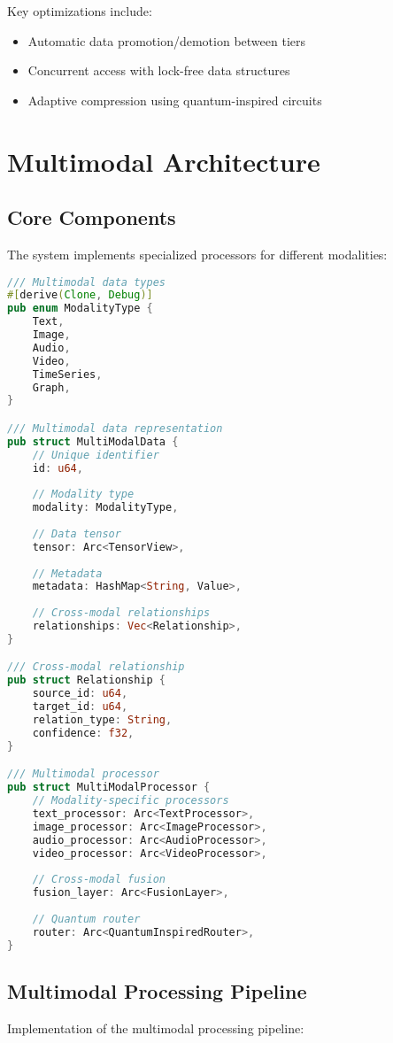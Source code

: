 \documentclass[10pt,twocolumn]{article}
\begin{document}
Key optimizations include:
\begin{itemize}
    \item Automatic data promotion/demotion between tiers
    \item Concurrent access with lock-free data structures
    \item Adaptive compression using quantum-inspired circuits
\end{itemize}

\section{Multimodal Architecture}
\subsection{Core Components}
The system implements specialized processors for different modalities:

\begin{lstlisting}[language=Rust]
/// Multimodal data types
#[derive(Clone, Debug)]
pub enum ModalityType {
    Text,
    Image,
    Audio,
    Video,
    TimeSeries,
    Graph,
}

/// Multimodal data representation
pub struct MultiModalData {
    // Unique identifier
    id: u64,
    
    // Modality type
    modality: ModalityType,
    
    // Data tensor
    tensor: Arc<TensorView>,
    
    // Metadata
    metadata: HashMap<String, Value>,
    
    // Cross-modal relationships
    relationships: Vec<Relationship>,
}

/// Cross-modal relationship
pub struct Relationship {
    source_id: u64,
    target_id: u64,
    relation_type: String,
    confidence: f32,
}

/// Multimodal processor
pub struct MultiModalProcessor {
    // Modality-specific processors
    text_processor: Arc<TextProcessor>,
    image_processor: Arc<ImageProcessor>,
    audio_processor: Arc<AudioProcessor>,
    video_processor: Arc<VideoProcessor>,
    
    // Cross-modal fusion
    fusion_layer: Arc<FusionLayer>,
    
    // Quantum router
    router: Arc<QuantumInspiredRouter>,
}
\end{lstlisting}

\subsection{Multimodal Processing Pipeline}
Implementation of the multimodal processing pipeline:
\end{document}
